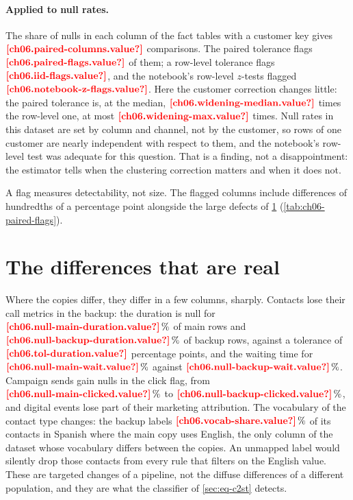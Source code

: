 \paragraph{Applied to null rates.} The share of nulls in each column of the fact tables with a customer key gives
$\est{ch06.paired-columns}{value}$ comparisons. The paired tolerance flags $\est{ch06.paired-flags}{value}$ of them; a
row-level tolerance flags $\est{ch06.iid-flags}{value}$, and the notebook's row-level $z$-tests flagged
$\est{ch06.notebook-z-flags}{value}$. Here the customer correction changes little: the paired tolerance is, at the
median, $\est{ch06.widening-median}{value}$ times the row-level one, at most $\est{ch06.widening-max}{value}$ times.
Null rates in this dataset are set by column and channel, not by the customer, so rows of one customer are nearly
independent with respect to them, and the notebook's row-level test was adequate for this question. That is a finding,
not a disappointment: the estimator tells when the clustering correction matters and when it does not.

A flag measures detectability, not size. The flagged columns include differences of hundredths of a percentage point
alongside the large defects of \cref{sec:eq-differences} (\cref{tab:ch06-paired-flags}).



\section{The differences that are real}\label{sec:eq-differences}

Where the copies differ, they differ in a few columns, sharply. Contacts lose their call metrics in the backup: the
duration is null for $\est{ch06.null-main-duration}{value}\,\%$ of main rows and $\est{ch06.null-backup-duration}{value}\,\%$
of backup rows, against a tolerance of $\est{ch06.tol-duration}{value}$ percentage points, and the waiting time for
$\est{ch06.null-main-wait}{value}\,\%$ against $\est{ch06.null-backup-wait}{value}\,\%$. Campaign sends gain nulls in
the click flag, from $\est{ch06.null-main-clicked}{value}\,\%$ to $\est{ch06.null-backup-clicked}{value}\,\%$, and
digital events lose part of their marketing attribution. The vocabulary of the contact type changes: the backup labels
$\est{ch06.vocab-share}{value}\,\%$ of its contacts in Spanish where the main copy uses English, the only column of the
dataset whose vocabulary differs between the copies. An unmapped label would silently drop those contacts from every
rule that filters on the English value. These are targeted changes of a pipeline, not the diffuse differences of a
different population, and they are what the classifier of \cref{sec:eq-c2st} detects.

